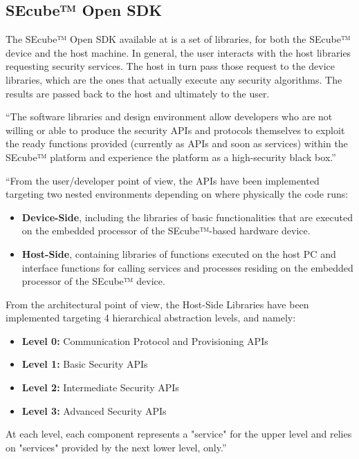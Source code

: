 \subsection{SEcube™ Open SDK}

The SEcube™ Open SDK available at \cite{SEcubeRes} is a set of libraries, for both the SEcube™ device and the host machine. In general, the user interacts with the host libraries requesting security services. The host in turn pass those request to the device libraries, which are the ones that actually execute any security algorithms. The results are passed back to the host and ultimately to the user.

``The software libraries and design environment allow developers who are not willing or able to produce the security APIs and protocols themselves to exploit the ready functions provided (currently as APIs and soon as services) within the SEcube™ platform and experience the platform as a high-security black box.'' \cite{L2UserMan}

``From the user/developer point of view, the APIs have been implemented targeting two
nested environments depending on where physically the code runs:
\begin{itemize}
\setlength\itemsep{1pt}
\item \textbf{Device-Side}, including the libraries of basic functionalities that are executed on the embedded processor of the SEcube™-based hardware device.
\item \textbf{Host-Side}, containing libraries of functions executed on the host PC and interface functions for calling services and processes residing on the embedded processor of the SEcube™ device.
\end{itemize} 

From the architectural point of view, the Host-Side Libraries have been implemented targeting 4 hierarchical abstraction levels, and namely:
\begin{itemize}
\setlength\itemsep{-3pt}
\item \textbf{Level 0:} Communication Protocol and Provisioning APIs
\item \textbf{Level 1:} Basic Security APIs
\item \textbf{Level 2:} Intermediate Security APIs
\item \textbf{Level 3:} Advanced Security APIs
\end{itemize}

At each level, each component represents a "service" for the upper level and relies on "services" provided by the next lower level, only.'' \cite{L2UserMan}

